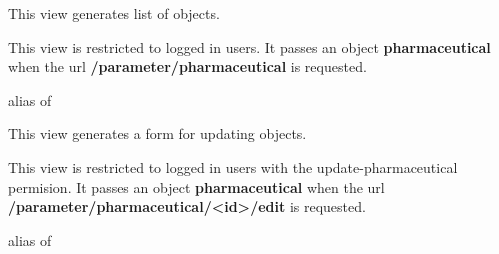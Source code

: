 \documentclass[letterpaper,10pt,english]{sphinxmanual}
\begin{document}
\begin{fulllineitems}
\label{data:mousedb.data.views.PharmaceuticalList}
This view generates list of {\hyperref[data:mousedb.data.models.Pharmaceutical]{}} objects.

This view is restricted to logged in users.
It passes an object \textbf{pharmaceutical} when the url \textbf{/parameter/pharmaceutical} is requested.

\begin{fulllineitems}
\label{data:mousedb.data.views.PharmaceuticalList.model}
alias of 

\end{fulllineitems}


\end{fulllineitems}


\begin{fulllineitems}
\label{data:mousedb.data.views.PharmaceuticalUpdate}
This view generates a form for updating {\hyperref[data:mousedb.data.models.Pharmaceutical]{}} objects.

This view is restricted to logged in users with the update-pharmaceutical permision. 
It passes an object \textbf{pharmaceutical} when the url \textbf{/parameter/pharmaceutical/\textless{}id\textgreater{}/edit} is requested.

\begin{fulllineitems}
\label{data:mousedb.data.views.PharmaceuticalUpdate.model}
alias of 

\end{fulllineitems}


\end{fulllineitems}

\end{document}

